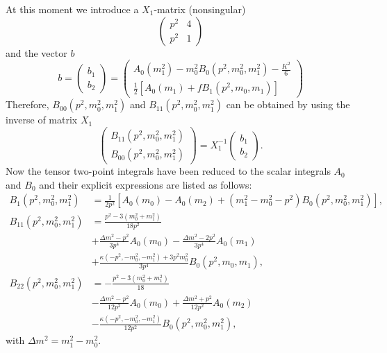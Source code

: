At this moment we introduce a $X_1$-matrix (nonsingular)
\begin{equation}
\left(
\begin{array}{cc}
p^2 & 4\\
p^2 & 1
\end{array}
\right)
\end{equation}
and the vector $b$
\begin{equation}
b=\left(
\begin{array}{c}
b_1\\b_2
\end{array}\right)
=
\left(
\begin{array}{c}
A_0(m_1^2)-m_0^2B_0(p^2,m_0^2,m_1^2)-\frac{K^2}{6}\\
\frac{1}{2}\left[A_0(m_1)+fB_1(p^2,m_0,m_1)\right]
\end{array}
\right)
\end{equation}
Therefore, $B_{00}(p^2,m_0^2,m_1^2)$ and $B_{11}(p^2,m_0^2,m_1^2)$ can be obtained by using the inverse of matrix $X_1$
\begin{equation}
\left(
\begin{array}{c}
B_{11}(p^2,m_0^2,m_1^2)\\B_{00}(p^2,m_0^2,m_1^2)
\end{array}
\right)
=X_1^{-1}\left(
\begin{array}{c}
b_1\\b_2
\end{array}\right).
\end{equation}
Now the tensor two-point integrals have been reduced to the scalar integrals $A_0$ and $B_0$ and their explicit expressions are listed as follows:
\begin{align}
B_1(p^2,m_0^2,m_1^2)&=\frac{1}{2p^2}[A_0(m_0)-A_0(m_2)+(m_1^2-m_0^2-p^2)B_0(p^2,m_0^2,m_1^2)],\nonumber\\
B_{11}(p^2,m_0^2,m_1^2)&=\frac{p^2-3(m_0^2+m_1^2)}{18p^2}\nonumber\\
&+\frac{\Delta m^2-p^2}{3p^4}A_0(m_0)-\frac{\Delta m^2-2p^2}{3p^4}A_0(m_1)
\nonumber\\
&+\frac{\kappa(-p^2,-m_0^2,-m_1^2)+3p^2m_0^2}{3p^4}B_0(p^2,m_0,m_1),\nonumber\\
B_{22}(p^2,m_0^2,m_1^2)&=-\frac{p^2-3(m_0^2+m_1^2)}{18}\nonumber\\
&-\frac{\Delta m^2-p^2}{12p^2}A_0(m_0)+\frac{\Delta m^2+p^2}{12p^2}A_0(m_2)\nonumber\\
&-\frac{\kappa(-p^2,-m_0^2,-m_1^2)}{12p^2}B_0(p^2,m_0^2,m_1^2),
\end{align}
with $\Delta m^2=m_1^2-m_0^2$. 
\newpage
